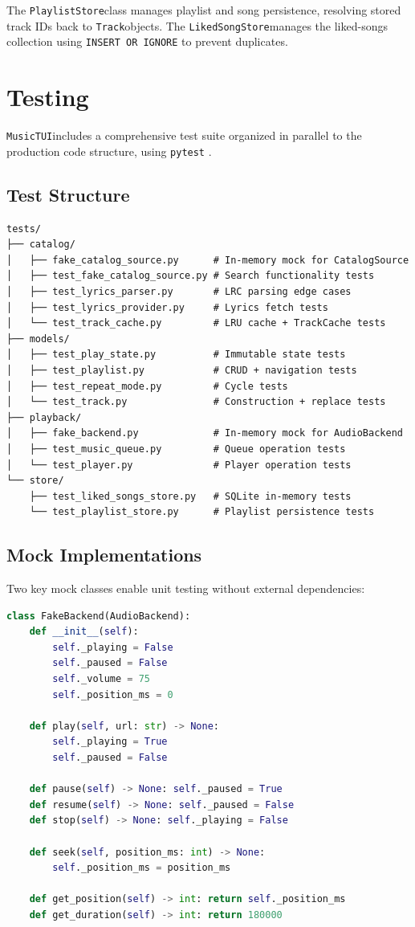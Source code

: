 \documentclass[a4paper,11pt,twoside]{article}
\newcommand{\musictui}{\texttt{MusicTUI}}
\newcommand{\track}{\texttt{Track}}
\newcommand{\playliststore}{\texttt{PlaylistStore}}
\newcommand{\likedsongstore}{\texttt{LikedSongStore}}
\begin{document}
The \playliststore class manages playlist and song persistence, resolving
stored track IDs back to \track objects. The \likedsongstore manages the
liked-songs collection using \texttt{INSERT OR IGNORE} to prevent duplicates.

\section{Testing}

\musictui includes a comprehensive test suite organized in parallel to the
production code structure, using \texttt{pytest} \cite{pytest}.

\subsection{Test Structure}

\begin{verbatim}
tests/
├── catalog/
│   ├── fake_catalog_source.py      # In-memory mock for CatalogSource
│   ├── test_fake_catalog_source.py # Search functionality tests
│   ├── test_lyrics_parser.py       # LRC parsing edge cases
│   ├── test_lyrics_provider.py     # Lyrics fetch tests
│   └── test_track_cache.py         # LRU cache + TrackCache tests
├── models/
│   ├── test_play_state.py          # Immutable state tests
│   ├── test_playlist.py            # CRUD + navigation tests
│   ├── test_repeat_mode.py         # Cycle tests
│   └── test_track.py               # Construction + replace tests
├── playback/
│   ├── fake_backend.py             # In-memory mock for AudioBackend
│   ├── test_music_queue.py         # Queue operation tests
│   └── test_player.py              # Player operation tests
└── store/
    ├── test_liked_songs_store.py   # SQLite in-memory tests
    └── test_playlist_store.py      # Playlist persistence tests
\end{verbatim}

\subsection{Mock Implementations}

Two key mock classes enable unit testing without external dependencies:

\begin{lstlisting}[language=Python, caption={FakeBackend mock for testing.}]
class FakeBackend(AudioBackend):
    def __init__(self):
        self._playing = False
        self._paused = False
        self._volume = 75
        self._position_ms = 0

    def play(self, url: str) -> None:
        self._playing = True
        self._paused = False

    def pause(self) -> None: self._paused = True
    def resume(self) -> None: self._paused = False
    def stop(self) -> None: self._playing = False

    def seek(self, position_ms: int) -> None:
        self._position_ms = position_ms

    def get_position(self) -> int: return self._position_ms
    def get_duration(self) -> int: return 180000
\end{lstlisting}
\end{document}
